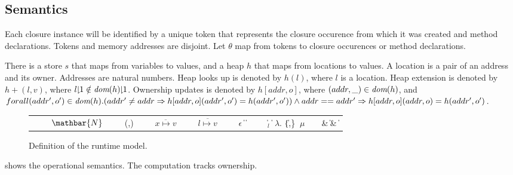 \subsection{Semantics}
Each closure instance will be identified by a unique token that represents the closure occurence from which it was created \cite{kassios2010specification} and method declarations. Tokens and memory addresses are disjoint. Let $\theta$ map from tokens to closure occurences or method declarations.

There is a store $s$ that maps from variables to values, and a heap $h$ that maps from locations to values. A location is a pair of an address and its owner. Addresses are natural numbers. 
Heap looks up is denoted by $h(l)$, where $l$ is a location. Heap extension is denoted by $h + (l, v)$, where $\RESTRICT{l}{1} \notin \RESTRICT{\DOM(h)}{1}$. 
Ownership updates is denoted by $h[addr, o]$, where $(addr, \_) \in \textit{dom}(h)$, and $for all (addr', o') \in \textit{dom}(h). (addr' \neq addr \Rightarrow h[addr, o](addr', o') = h(addr', o')) \land addr == addr' \Rightarrow h[addr, o](addr, o) = h(addr', o')$.

\begin{figure}[!ht]
\small
\centering
\begin{grammar}%
\begin{tabular}{r r l}
$~$ & \: & $\mathbar{N}$
$~$ & \: & (,)
$~$ & \: & $\overline{x \mapsto v}$
$~$ & \: & $\overline{l \mapsto v}$
$~$ & \: & $\epsilon$ \|  \|  
$~$ & \: &  \| $_l$ \| $\lambda$. \| \{,\}
$~\mu$ & \: & \& \| \& \| 
\end{tabular} %
\end{grammar}
\caption{Definition of the runtime model.}
\label{fig:runtime}
\end{figure}


 shows the operational semantics. The computation tracks ownership.


